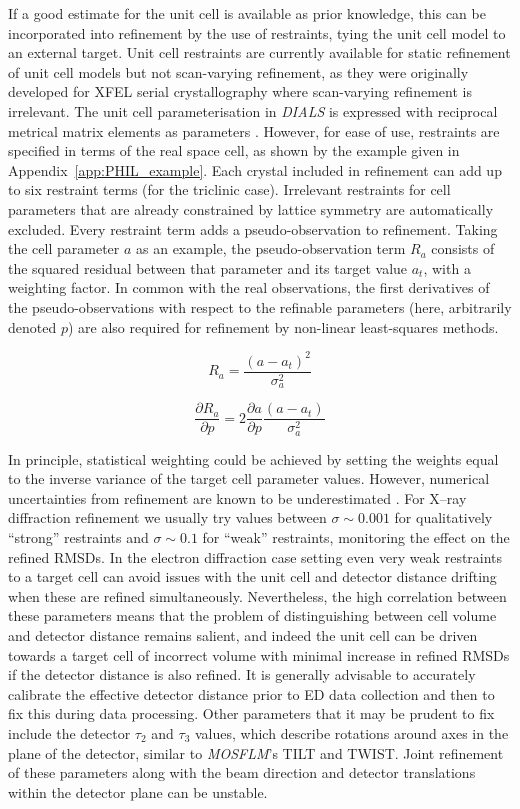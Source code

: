 \documentclass[preprint]{iucr}
\newcommand{\dials}{\emph{DIALS}\xspace}
\newcommand{\mosflm}{\emph{MOSFLM}\xspace}
\newcommand{\pder}[2][]{\frac{\partial#1}{\partial#2}}
\begin{document}
If a good estimate for the unit cell is available as prior knowledge, this can
be incorporated into refinement by the use of restraints, tying the unit cell
model to an external target. Unit cell restraints are currently available for
static refinement of unit cell models but not scan-varying refinement, as they
were originally developed for XFEL serial crystallography where scan-varying
refinement is irrelevant. The unit cell parameterisation in \dials is expressed
with reciprocal metrical matrix elements as parameters \cite{Waterman2016}.
However, for ease of use, restraints are specified in terms of the real space
cell, as shown by the example given in Appendix~\ref{app:PHIL_example}. Each
crystal included in refinement can add up to six restraint terms (for the
triclinic case). Irrelevant restraints for cell parameters that are already
constrained by lattice symmetry are automatically excluded. Every restraint
term adds a pseudo-observation to refinement. Taking the cell parameter $a$ as
an example, the pseudo-observation term $R_a$ consists of the squared residual
between that parameter and its target value $a_t$, with a weighting factor. In
common with the real observations, the first derivatives of the
pseudo-observations with respect to the refinable parameters (here, arbitrarily
denoted $p$) are also required for refinement by non-linear least-squares
methods.

\begin{equation}
\label{eq:restraint_to_target}
R_a = \frac{\left( a - a_t \right)^2}{\sigma_a^2}
\end{equation}

\begin{equation}
\pder[R_a]{p} = 2 \pder[a]{p} \frac{\left( a - a_t \right)}{\sigma_a^2}
\end{equation}

In principle, statistical weighting could be achieved by setting the weights
equal to the inverse variance of the target cell parameter values. However,
numerical uncertainties from refinement are
known to be underestimated \cite{Dauter2015}. For X--ray diffraction refinement
we usually try values between $\sigma \sim 0.001$ for qualitatively ``strong''
restraints and $\sigma \sim 0.1$ for ``weak'' restraints, monitoring the effect
on the refined RMSDs. In the electron diffraction case setting even very weak
restraints to a target cell can avoid issues with the unit cell and detector
distance drifting when these are refined simultaneously. Nevertheless, the high
correlation between these parameters means that the problem of distinguishing
between cell volume and detector distance remains salient, and indeed the unit
cell can be driven towards a target cell of incorrect volume with minimal
increase in refined RMSDs if the detector distance is also refined. It is
generally advisable to accurately calibrate the effective detector distance
prior to ED data collection and then to fix this during data processing. Other
parameters that it may be prudent to fix include the detector $\tau_2$ and
$\tau_3$ values, which describe rotations around axes in the plane of the
detector, similar to \mosflm's TILT and TWIST. Joint refinement of these
parameters along with the beam direction and detector translations
within the detector plane can be unstable.
\end{document}
